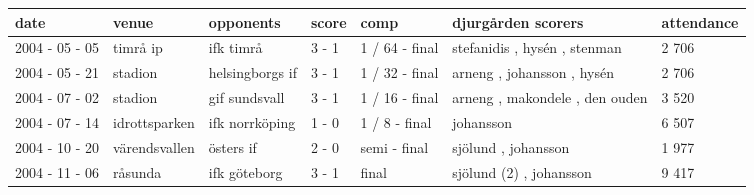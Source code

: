 \documentclass{article}
\begin{document}
\begin{tabular}{lllllll}
\toprule
date & venue & opponents & score & comp & djurgården scorers & attendance \\
\midrule
2004 - 05 - 05 & timrå ip & ifk timrå & 3 - 1 & 1 / 64 - final & stefanidis , hysén , stenman & 2 706 \\
2004 - 05 - 21 & stadion & helsingborgs if & 3 - 1 & 1 / 32 - final & arneng , johansson , hysén & 2 706 \\
2004 - 07 - 02 & stadion & gif sundsvall & 3 - 1 & 1 / 16 - final & arneng , makondele , den ouden & 3 520 \\
2004 - 07 - 14 & idrottsparken & ifk norrköping & 1 - 0 & 1 / 8 - final & johansson & 6 507 \\
2004 - 10 - 20 & värendsvallen & östers if & 2 - 0 & semi - final & sjölund , johansson & 1 977 \\
2004 - 11 - 06 & råsunda & ifk göteborg & 3 - 1 & final & sjölund (2) , johansson & 9 417 \\
\bottomrule
\end{tabular}
\end{document}
